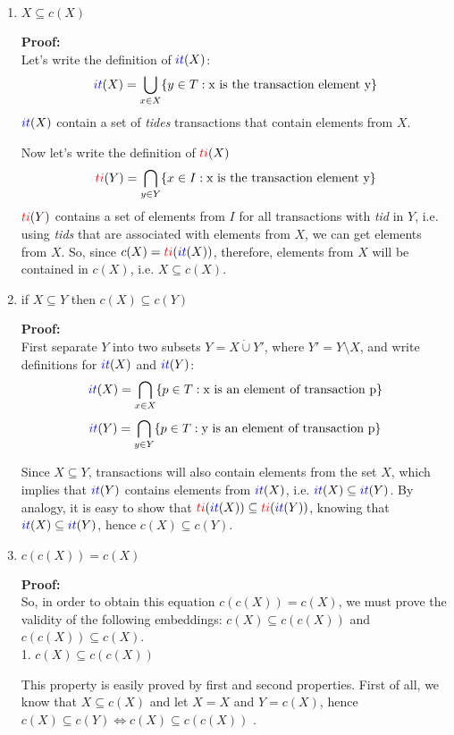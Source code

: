 \documentclass{article}
\newcommand{\Ti}{\textcolor{red}{ti}}
\newcommand{\It}{\textcolor{blue}{it}}
\begin{document}
  \begin{enumerate}
    \item $X \subseteq c(X)$

    \textbf{Proof:} \\
    Let's write the definition of $\It(X)$:
    \[ \It(X) = \bigcup_{x \in X} \{y\in T: \text{x is the transaction element y}\} \]
    $\It(X)$ contain a set of \textit{tides} transactions that contain elements from $X$.

    Now let's write the definition of $\Ti(X)$
    \[ \Ti(Y) = \bigcap_{y\in Y} \{x \in I: \text{x is the transaction element y}\} \]
    $\Ti(Y)$ contains a set of elements from $I$ for all transactions with \textit{tid} in $Y$, i.e. using \textit{tids} that are associated with elements from $X$, we can get elements from $X$. So, since $c(X) = \Ti(\It(X))$, therefore, elements from $X$ will be contained in $c(X)$, i.e. $X \subseteq c(X)$.

    \item if $X \subseteq Y$ then $c(X) \subseteq c(Y)$

    \textbf{Proof:} \\
    First separate $Y$ into two subsets $Y = X \dot{\cup} Y'$, where $Y' = Y \setminus X$,
    and write definitions for $\It(X)$ and $\It(Y)$:
    \[ \It(X) = \bigcap_{x \in X} \{p \in T: \text{x is an element of transaction p}\} \]
    \[ \It(Y) = \bigcap_{y \in Y} \{p \in T: \text{y is an element of transaction p}\} \]

    Since $X\subseteq Y$, transactions will also contain elements from the set $X$, which implies that $\It(Y)$ contains elements from $\It(X)$, i.e. $\It(X) \subseteq \It(Y)$. By analogy, it is easy to show that $\Ti(\It(X))\subseteq \Ti(\It(Y))$, knowing that $\It(X)\subseteq \It(Y)$, hence $c(X)\subseteq c(Y)$.

    \item $c(c(X)) = c(X)$

    \textbf{Proof:} \\
    So, in order to obtain this equation $c(c(X)) = c(X)$, we must prove the validity of the following embeddings: $c(X) \subseteq c(c(X))$ and $c(c(X)) \subseteq c(X)$. \\

    1. $c(X) \subseteq c(c(X))$

    This property is easily proved by first and second properties. First of all, we know that $X \subseteq c(X)$ and let $X = X$ and $Y = c(X)$, hence $c(X) \subseteq c(Y) \iff c(X) \subseteq c(c(X))$ . \\


\end{enumerate}
\end{document}
